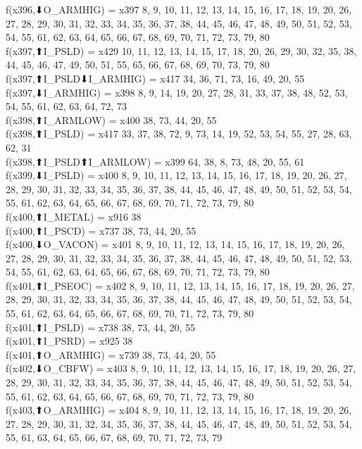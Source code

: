 f(x396,⬇O_ARMHIG) = x397 {8, 9, 10, 11, 12, 13, 14, 15, 16, 17, 18, 19, 20, 26, 27, 28, 29, 30, 31, 32, 33, 34, 35, 36, 37, 38, 44, 45, 46, 47, 48, 49, 50, 51, 52, 53, 54, 55, 61, 62, 63, 64, 65, 66, 67, 68, 69, 70, 71, 72, 73, 79, 80} \\
f(x397,⬆I_PSLD) = x429 {10, 11, 12, 13, 14, 15, 17, 18, 20, 26, 29, 30, 32, 35, 38, 44, 45, 46, 47, 49, 50, 51, 55, 65, 66, 67, 68, 69, 70, 73, 79, 80} \\
f(x397,⬆I_PSLD⬇I_ARMHIG) = x417 {34, 36, 71, 73, 16, 49, 20, 55} \\
f(x397,⬇I_ARMHIG) = x398 {8, 9, 14, 19, 20, 27, 28, 31, 33, 37, 38, 48, 52, 53, 54, 55, 61, 62, 63, 64, 72, 73} \\
f(x398,⬆I_ARMLOW) = x400 {38, 73, 44, 20, 55} \\
f(x398,⬆I_PSLD) = x417 {33, 37, 38, 72, 9, 73, 14, 19, 52, 53, 54, 55, 27, 28, 63, 62, 31} \\
f(x398,⬆I_PSLD⬆I_ARMLOW) = x399 {64, 38, 8, 73, 48, 20, 55, 61} \\
f(x399,⬇I_PSLD) = x400 {8, 9, 10, 11, 12, 13, 14, 15, 16, 17, 18, 19, 20, 26, 27, 28, 29, 30, 31, 32, 33, 34, 35, 36, 37, 38, 44, 45, 46, 47, 48, 49, 50, 51, 52, 53, 54, 55, 61, 62, 63, 64, 65, 66, 67, 68, 69, 70, 71, 72, 73, 79, 80} \\
f(x400,⬆I_METAL) = x916 {38} \\
f(x400,⬆I_PSCD) = x737 {38, 73, 44, 20, 55} \\
f(x400,⬇O_VACON) = x401 {8, 9, 10, 11, 12, 13, 14, 15, 16, 17, 18, 19, 20, 26, 27, 28, 29, 30, 31, 32, 33, 34, 35, 36, 37, 38, 44, 45, 46, 47, 48, 49, 50, 51, 52, 53, 54, 55, 61, 62, 63, 64, 65, 66, 67, 68, 69, 70, 71, 72, 73, 79, 80} \\
f(x401,⬆I_PSEOC) = x402 {8, 9, 10, 11, 12, 13, 14, 15, 16, 17, 18, 19, 20, 26, 27, 28, 29, 30, 31, 32, 33, 34, 35, 36, 37, 38, 44, 45, 46, 47, 48, 49, 50, 51, 52, 53, 54, 55, 61, 62, 63, 64, 65, 66, 67, 68, 69, 70, 71, 72, 73, 79, 80} \\
f(x401,⬆I_PSLD) = x738 {38, 73, 44, 20, 55} \\
f(x401,⬆I_PSRD) = x925 {38} \\
f(x401,⬆O_ARMHIG) = x739 {38, 73, 44, 20, 55} \\
f(x402,⬇O_CBFW) = x403 {8, 9, 10, 11, 12, 13, 14, 15, 16, 17, 18, 19, 20, 26, 27, 28, 29, 30, 31, 32, 33, 34, 35, 36, 37, 38, 44, 45, 46, 47, 48, 49, 50, 51, 52, 53, 54, 55, 61, 62, 63, 64, 65, 66, 67, 68, 69, 70, 71, 72, 73, 79, 80} \\
f(x403,⬆O_ARMHIG) = x404 {8, 9, 10, 11, 12, 13, 14, 15, 16, 17, 18, 19, 20, 26, 27, 28, 29, 30, 31, 32, 34, 35, 36, 37, 38, 44, 45, 46, 47, 48, 49, 50, 51, 52, 53, 54, 55, 61, 63, 64, 65, 66, 67, 68, 69, 70, 71, 72, 73, 79} \\

